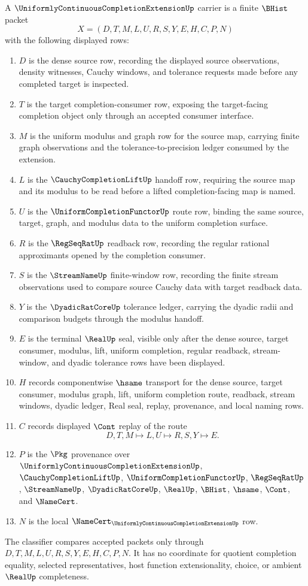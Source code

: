 \begin{definition}
\label{def:uniformly-continuous-completion-extension-carrier}
A $\UniformlyContinuousCompletionExtensionUp$ carrier is a finite $\BHist$ packet
$$
X=(D,T,M,L,U,R,S,Y,E,H,C,P,N)
$$
with the following displayed rows:
\begin{enumerate}
\item $D$ is the dense source row, recording the displayed source observations, density witnesses, Cauchy windows, and tolerance requests made before any completed target is inspected.
\item $T$ is the target completion-consumer row, exposing the target-facing completion object only through an accepted consumer interface.
\item $M$ is the uniform modulus and graph row for the source map, carrying finite graph observations and the tolerance-to-precision ledger consumed by the extension.
\item $L$ is the $\CauchyCompletionLiftUp$ handoff row, requiring the source map and its modulus to be read before a lifted completion-facing map is named.
\item $U$ is the $\UniformCompletionFunctorUp$ route row, binding the same source, target, graph, and modulus data to the uniform completion surface.
\item $R$ is the $\RegSeqRatUp$ readback row, recording the regular rational approximants opened by the completion consumer.
\item $S$ is the $\StreamNameUp$ finite-window row, recording the finite stream observations used to compare source Cauchy data with target readback data.
\item $Y$ is the $\DyadicRatCoreUp$ tolerance ledger, carrying the dyadic radii and comparison budgets through the modulus handoff.
\item $E$ is the terminal $\RealUp$ seal, visible only after the dense source, target consumer, modulus, lift, uniform completion, regular readback, stream-window, and dyadic tolerance rows have been displayed.
\item $H$ records componentwise $\hsame$ transport for the dense source, target consumer, modulus graph, lift, uniform completion route, readback, stream windows, dyadic ledger, Real seal, replay, provenance, and local naming rows.
\item $C$ records displayed $\Cont$ replay of the route
$$
D,T,M \longmapsto L,U \longmapsto R,S,Y \longmapsto E .
$$
\item $P$ is the $\Pkg$ provenance over $\UniformlyContinuousCompletionExtensionUp$, $\CauchyCompletionLiftUp$, $\UniformCompletionFunctorUp$, $\RegSeqRatUp$, $\StreamNameUp$, $\DyadicRatCoreUp$, $\RealUp$, $\BHist$, $\hsame$, $\Cont$, and $\NameCert$.
\item $N$ is the local $\NameCert_{\UniformlyContinuousCompletionExtensionUp}$ row.
\end{enumerate}
The classifier compares accepted packets only through $D,T,M,L,U,R,S,Y,E,H,C,P,N$. It has no coordinate for quotient completion equality, selected representatives, host function extensionality, choice, or ambient $\RealUp$ completeness.
\end{definition}
